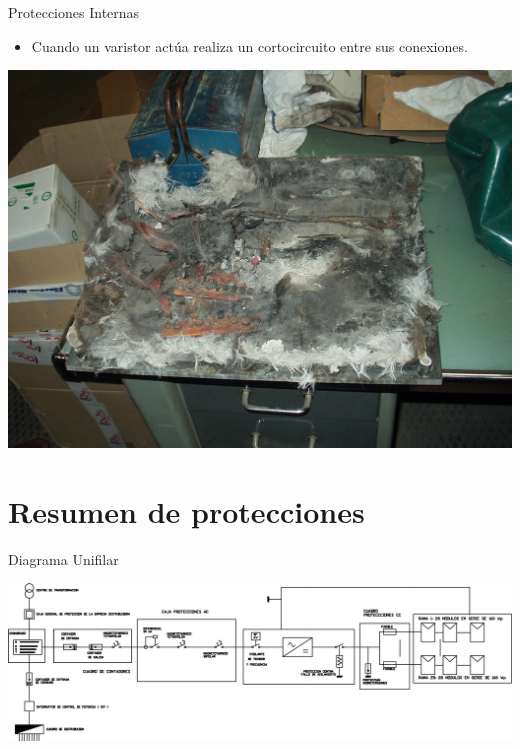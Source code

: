 \documentclass[xcolor={usenames,svgnames,dvipsnames}]{beamer}
\begin{document}
\begin{frame}[label={sec:org15f39a7}]{Protecciones Internas}
\begin{itemize}
\item Cuando un varistor actúa realiza un cortocircuito entre sus
conexiones.
\end{itemize}

\begin{center}
\includegraphics[width=.9\linewidth]{../figs/CajaForumDestruida.pdf}
\end{center}
\end{frame}

\section{Resumen de protecciones}
\label{sec:org5277553}

\begin{frame}[plain,label={sec:org6e3330d}]{Diagrama Unifilar}
\begin{center}
\includegraphics[width=1.2\textwidth]{../figs/UnifilarCR1.pdf}
\end{center}
\end{frame}
\end{document}
